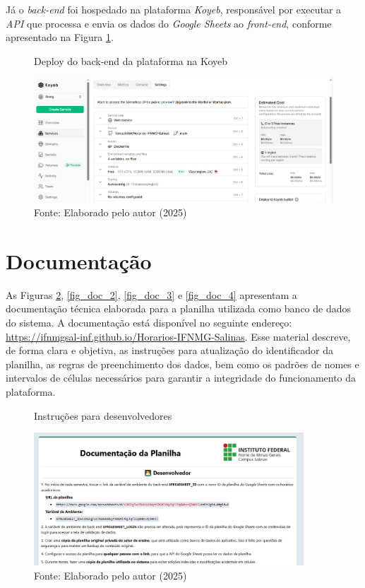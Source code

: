 Já o \textit{back-end} foi hospedado na plataforma \textit{Koyeb}, responsável por executar a \textit{API} que processa e envia os dados do \textit{Google Sheets} ao \textit{front-end}, conforme apresentado na Figura \ref{fig_deploy_2}.

\begin{figure}[htb]
    \centering
    \caption{Deploy do back-end da plataforma na Koyeb}
    \includegraphics[width=1\textwidth]{Figuras/deploy-2.png}
    \caption*{Fonte: Elaborado pelo autor (2025)}
    \label{fig_deploy_2}
\end{figure}

\section{Documentação}

As Figuras \ref{fig_doc_1}, \ref{fig_doc_2}, \ref{fig_doc_3} e \ref{fig_doc_4} apresentam a documentação técnica elaborada para a planilha utilizada como banco de dados do sistema. A documentação está disponível no seguinte endereço: \url{https://ifnmgsal-inf.github.io/Horarios-IFNMG-Salinas}. Esse material descreve, de forma clara e objetiva, as instruções para atualização do identificador da planilha, as regras de preenchimento dos dados, bem como os padrões de nomes e intervalos de células necessários para garantir a integridade do funcionamento da plataforma.

\begin{figure}[htb]
    \centering
    \caption{Instruções para desenvolvedores}
    \includegraphics[width=0.9\textwidth]{Figuras/doc-1.png}
    \caption*{Fonte: Elaborado pelo autor (2025)}
    \label{fig_doc_1}
\end{figure}

